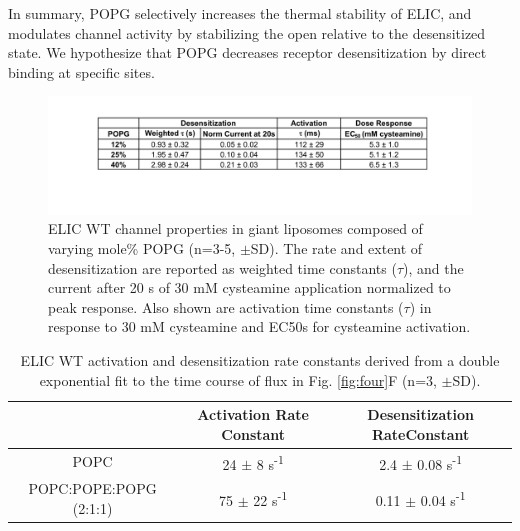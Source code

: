 In summary, POPG selectively increases the thermal stability of ELIC,
and modulates channel activity by stabilizing the open relative to the
desensitized state. We hypothesize that POPG decreases receptor
desensitization by direct binding at specific sites.

\begin{figure}
\includegraphics[width=\linewidth]{./pandoc_test/media/image3.pdf}
\caption[ELIC WT channel properties in giant liposomes composed of varying mole\% POPG (n=3-5, $\pm$SD).] {ELIC WT channel properties in giant liposomes composed of varying mole\% POPG (n=3-5, $\pm$SD). The rate and extent of desensitization are reported as weighted time constants ($\tau$), and the current after 20 s of 30 mM cysteamine application normalized to peak response. Also shown are activation time constants ($\tau$) in response to 30 mM cysteamine and EC50s for cysteamine activation.} \label{fig:three}
\end{figure}

\begin{table}
    \caption{ELIC WT activation and desensitization rate constants derived from a double exponential fit to the time course of flux in Fig. \ref{fig:four}F (n=3, $\pm$SD). }
    \begin{tabular}{|c|c|c|}
	\hline
    {} & Activation Rate Constant & Desensitization RateConstant\\ \hline
    POPC & 24 $\pm$ 8 s\textsuperscript{-1} & 2.4 $\pm$ 0.08
    s\textsuperscript{-1}\\ \hline
    POPC:POPE:POPG (2:1:1) & 75 $\pm$ 22 s\textsuperscript{-1} & 0.11 $\pm$
    0.04 s\textsuperscript{-1}\\ \hline
    
    \end{tabular}
\end{table}


